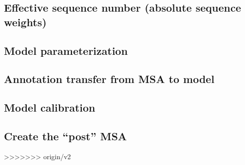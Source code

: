 \subsection{Effective sequence number (absolute sequence weights)}

\subsection{Model parameterization}

\subsection{Annotation transfer from MSA to model}

\subsection{Model calibration}

\subsection{Create the ``post'' MSA}















>>>>>>> origin/v2
